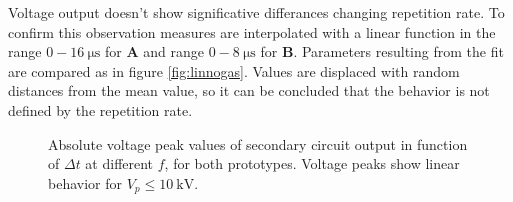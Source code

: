 Voltage output doesn't show significative differances changing repetition rate. To confirm this observation measures are interpolated with a linear function in the range $0-\SI{16}{\micro\second}$ for \textbf{A} and range $0-\SI{8}{\micro\second}$ for \textbf{B}. Parameters resulting from the fit are compared as in figure \ref{fig:linnogas}. Values are displaced with random distances from the mean value, so it can be concluded that the behavior is not defined by the repetition rate.
\begin{figure}
 \centering
 \hfill
 \caption{Absolute voltage peak values of secondary circuit output in function of $\Delta t$ at different $f$, for both prototypes. Voltage peaks show linear behavior for $V_p \le \SI{10}{\kilo\volt}$.}
 \label{fig:nogas}
\end{figure}

